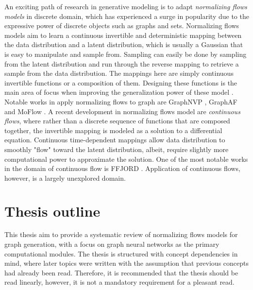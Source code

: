 An exciting path of research in generative modeling is to adapt \textit{normalizing flows models} in discrete domain, which has experienced a surge in popularity due to the expressive power of discrete objects such as graphs and sets. Normalizing flows models aim to learn a continuous invertible and deterministic mapping between the data distribution and a latent distribution, which is usually a Gaussian that is easy to manipulate and sample from. Sampling can easily be done by sampling from the latent distribution and run through the reverse mapping to retrieve a sample from the data distribution. The mappings here are simply continuous invertible functions or a composition of them. Designing these functions is the main area of focus when improving the generalization power of these model \cite{kobyzevNormalizingFlowsIntroduction2021}. Notable works in apply normalizing flows to graph are GraphNVP \cite{madhawaGraphNVPInvertibleFlow2019}, GraphAF \cite{shiGraphAFFlowbasedAutoregressive2020} and MoFlow \cite{zangMoFlowInvertibleFlow2020}. A recent development in normalizing flows model are \textit{continuous flows}, where rather than a discrete sequence of functions that are composed together, the invertible mapping is modeled as a solution to a differential equation. Continuous time-dependent mappings allow data distribution to smoothly "flow" toward the latent distribution, albeit, require slightly more computational power to approximate the solution. One of the most notable works in the domain of continuous flow is FFJORD \cite{grathwohlFFJORDFreeformContinuous2018}. Application of continuous flows, however, is a largely unexplored domain.

\section{Thesis outline}

This thesis aim to provide a systematic review of normalizing flows models for graph generation, with a focus on graph neural networks as the primary computational modules. The thesis is structured with concept dependencies in mind, where later topics were written with the assumption that previous concepts had already been read. Therefore, it is recommended that the thesis should be read linearly, however, it is not a mandatory requirement for a pleasant read.

